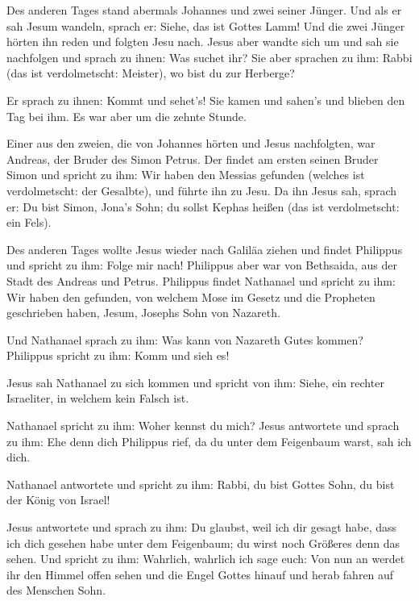  Des anderen Tages stand abermals Johannes und zwei
seiner Jünger.  Und als er sah Jesum wandeln, sprach er:
Siehe, das ist Gottes Lamm!  Und die zwei Jünger hörten
ihn reden und folgten Jesu nach.  Jesus aber wandte sich
um und sah sie nachfolgen und sprach zu ihnen: Was suchet ihr? Sie aber
sprachen zu ihm: Rabbi (das ist verdolmetscht: Meister), wo bist du zur
Herberge?

 Er sprach zu ihnen: Kommt und sehet's! Sie kamen und
sahen's und blieben den Tag bei ihm. Es war aber um die zehnte Stunde.

 Einer aus den zweien, die von Johannes hörten und Jesus
nachfolgten, war Andreas, der Bruder des Simon Petrus. 
Der findet am ersten seinen Bruder Simon und spricht zu ihm: Wir haben
den Messias gefunden (welches ist verdolmetscht: der Gesalbte),
 und führte ihn zu Jesu. Da ihn Jesus sah, sprach er: Du
bist Simon, Jona's Sohn; du sollst Kephas heißen (das ist verdolmetscht:
ein Fels).

 Des anderen Tages wollte Jesus wieder nach Galiläa
ziehen und findet Philippus und spricht zu ihm: Folge mir nach!
 Philippus aber war von Bethsaida, aus der Stadt des
Andreas und Petrus.  Philippus findet Nathanael und
spricht zu ihm: Wir haben den gefunden, von welchem Mose im Gesetz und
die Propheten geschrieben haben, Jesum, Josephs Sohn von Nazareth.

 Und Nathanael sprach zu ihm: Was kann von Nazareth Gutes
kommen? Philippus spricht zu ihm: Komm und sieh es!

 Jesus sah Nathanael zu sich kommen und spricht von ihm:
Siehe, ein rechter Israeliter, in welchem kein Falsch ist.

 Nathanael spricht zu ihm: Woher kennst du mich? Jesus
antwortete und sprach zu ihm: Ehe denn dich Philippus rief, da du unter
dem Feigenbaum warst, sah ich dich.

 Nathanael antwortete und spricht zu ihm: Rabbi, du bist
Gottes Sohn, du bist der König von Israel!

 Jesus antwortete und sprach zu ihm: Du glaubst, weil ich
dir gesagt habe, dass ich dich gesehen habe unter dem Feigenbaum; du
wirst noch Größeres denn das sehen.  Und spricht zu ihm:
Wahrlich, wahrlich ich sage euch: Von nun an werdet ihr den Himmel offen
sehen und die Engel Gottes hinauf und herab fahren auf des Menschen
Sohn.

